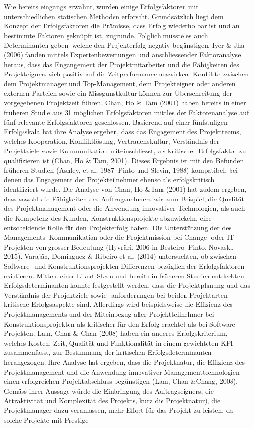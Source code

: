 \documentclass[11pt]{article}
\begin{document}
\newline
Wie bereits eingangs erwähnt, wurden einige Erfolgsfaktoren mit unterschiedlichen statischen Methoden erforscht. Grundsätzlich liegt dem Konzept der Erfolgsfaktoren die Prämisse, dass Erfolg wiederholbar ist und an bestimmte Faktoren geknüpft ist, zugrunde. Folglich müsste es auch Determinanten geben, welche den Projekterfolg negativ begünstigen. Iyer \& Jha (2006) fanden mittels Expertenbewertungen und anschliessender Faktoranalyse heraus, dass das Engangement der Projektmitarbeiter und die Fähigkeiten des Projekteigners sich positiv auf die Zeitperformance auswirken. Konflikte zwischen dem Projektmanager und Top-Management, dem Projekteigner oder anderen externen Parteien sowie ein Missgunstkultur können zur Überschreitung der vorgegebenen Projektzeit führen. Chan, Ho \& Tam (2001) haben bereits in einer früheren Studie aus 31 möglichen Erfolgsfaktoren mittles der Faktorenanalyse auf fünf relevante Erfolgsfaktoren geschlossen. Basierend auf einer fünfstufigen Erfolgsskala hat ihre Analyse ergeben, dass das Engagement des Projektteams, welches Kooperation, Konfliktlösung, Vertrauenskultur, Verständnis der Projektziele sowie Kommunikation miteinschliesst, als kritischer Erfolgsfaktor zu qualifizieren ist (Chan, Ho \& Tam, 2001). Dieses Ergebnis ist mit den Befunden früheren Studien (Ashley, et al. 1987, Pinto und Slevin, 1988) kompatibel, bei denen das Engagement der Projekteilnehmer ebenso als erfolgskritisch identifiziert wurde. Die Analyse von Chan, Ho \&Tam (2001) hat zudem ergeben, dass sowohl die Fähigkeiten des Auftragsnehmers wie zum Beispiel, die Qualität des Projektmanagement oder die Anwendung innovativer Technologien, als auch die Kompetenz des Kunden, Konstruktionsprojekte abzuwickeln, eine entscheidende Rolle für den Projekterfolg haben. Die Unterstützung der des Managements, Kommunikation oder die Projektmission bei Change- oder IT-Projekten von grosser Bedeutung (Hyvräri, 2006 in Besteiro, Pinto, Novaski, 2015). Varajão, Dominguez \& Ribeiro et al. (2014) untersuchten, ob zwischen Software- und Konstruktionsprojekten Differenzen bezüglich der Erfolgsfaktoren existieren. Mittels einer Likert-Skala und bereits in früheren Studien entdeckten Erfolgsdeterminanten konnte festgestellt werden, dass die Projektplanung und das Verständnis der Projektziele sowie -anforderungen bei beiden Projektarten kritische Erfolgsaspekte sind. Allerdings wird beispielsweise die Effizienz des Projektmanagements und der Miteinbezug aller Projektteilnehmer bei Konstruktionsprojekten als kritischer für den Erfolg erachtet als bei Software-Projekten. Lam, Chan \& Chan (2008) haben ein anderes Erfolgskriterium, welches Kosten, Zeit, Qualität und Funktionalität in einem gewichteten KPI zusammenfasst, zur Bestimmung der kritischen Erfolgsdeterminanten herangezogen. Ihre Analyse hat ergeben, dass die Projektnatur, die Effizienz des Projektmanagement und die Anwendung innovativer Managementtechnologien einen erfolgreichen Projektabschluss begünstigen (Lam, Chan \&Chang, 2008). Gemäss ihrer Aussage würde die Einbringung des Auftragseigners, die Attraktivität und Komplexität des Projekts, kurz die Projektnatur), die Projektmanager dazu veranlassen, mehr Effort für das Projekt zu leisten, da solche Projekte mit Prestige 
\end{document}
